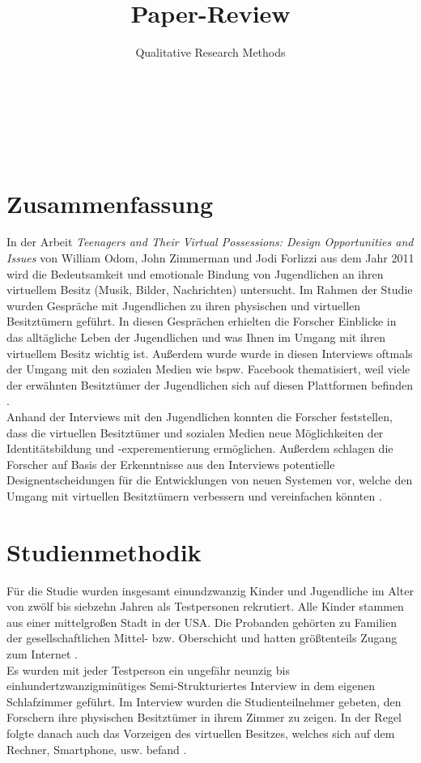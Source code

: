 \documentclass{hsflensburg}
\title{Paper-Review}
\subtitle{Qualitative Research Methods}
\author{
	\name{Tom Hartelt}\\
	\institution{Hochschule Flensburg}
	\and
	\name{Martin Hermannsen}\\
	\institution{Hochschule Flensburg}
	\and
	\name{Michael Frank}\\
	\institution{Hochschule Flensburg}
}
\begin{document}
	\maketitle
 	 \tableofcontents

  \pagebreak
	
	\section{Zusammenfassung}
	In der Arbeit \textit{Teenagers and Their Virtual Possessions: Design Opportunities and Issues} von
 	William Odom, John Zimmerman und Jodi Forlizzi aus dem Jahr 2011 wird die Bedeutsamkeit 
	und emotionale Bindung von Jugendlichen an ihren virtuellem Besitz (Musik, Bilder, Nachrichten) untersucht. 
	Im Rahmen der Studie wurden Gespräche mit  Jugendlichen zu ihren physischen und virtuellen Besitztümern 
	geführt. In diesen Gesprächen erhielten die Forscher Einblicke in das alltägliche Leben der 
	Jugendlichen und was Ihnen im  Umgang mit ihren virtuellem Besitz wichtig ist. Außerdem wurde
	wurde in diesen Interviews oftmals der Umgang mit den sozialen Medien wie bspw. Facebook thematisiert, 
	weil viele der erwähnten Besitztümer der Jugendlichen sich auf diesen Plattformen befinden 
	\cite{odom2011teenagers}. \\

	Anhand der Interviews mit den Jugendlichen konnten die Forscher feststellen, dass die 
	virtuellen Besitztümer und sozialen Medien neue Möglichkeiten der Identitätsbildung 
	und -experementierung ermöglichen. Außerdem schlagen die Forscher auf Basis der 
	Erkenntnisse aus den Interviews potentielle Designentscheidungen für die 
	Entwicklungen von neuen Systemen vor, welche den Umgang mit virtuellen 
	Besitztümern verbessern und vereinfachen könnten \cite{odom2011teenagers}. 


	\section{Studienmethodik}
	Für die Studie wurden insgesamt einundzwanzig Kinder und Jugendliche im Alter
	von zwölf bis siebzehn Jahren als Testpersonen rekrutiert. Alle Kinder stammen
	aus einer mittelgroßen Stadt in der USA. Die Probanden gehörten zu Familien
	der gesellschaftlichen Mittel- bzw. Oberschicht und hatten größtenteils Zugang 
	zum Internet \cite{odom2011teenagers}. \\

	Es wurden mit jeder Testperson ein ungefähr neunzig bis einhundertzwanzigminütiges
	Semi-Strukturiertes Interview in dem eigenen Schlafzimmer geführt. Im Interview
	wurden die Studienteilnehmer gebeten, den Forschern ihre physischen Besitztümer
	in ihrem Zimmer zu zeigen. In der Regel folgte danach auch das Vorzeigen des
	virtuellen Besitzes, welches sich auf dem Rechner, Smartphone, usw. befand 
	\cite{odom2011teenagers}. \\
\end{document}
